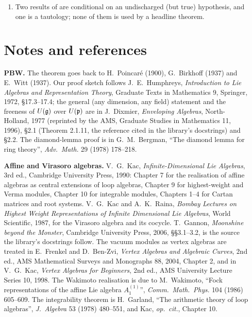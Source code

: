 \begin{enumerate}
  docstring, which still calls  an axiom and  an unproved hypothesis; the
   remark that no pbw-free proof of nonvanishing is possible; and the
  closing comment of . Comments calling  an axiom are
  out of date throughout the library (Notes/Textbook/referee/pbw\_sweep.md lists the book-side
  occurrences). None affects a Lean statement.
\item Two results of  are conditional on an undischarged (but true) hypothesis,
  and one is a tautology; none of them is used by a headline theorem.
\end{enumerate}

\section{Notes and references}\label{l02:sec:notes}

\textbf{PBW.} The theorem goes back to H.~Poincar\'e (1900), G.~Birkhoff (1937) and E.~Witt (1937). Our
proof sketch follows J.~E.~Humphreys, \emph{Introduction to Lie Algebras and Representation Theory},
Graduate Texts in Mathematics 9, Springer, 1972, \S17.3--17.4; the general (any dimension, any field)
statement and the freeness of $U(\mathfrak{g})$ over $U(\mathfrak{p})$ are in J.~Dixmier, \emph{Enveloping Algebras},
North-Holland, 1977 (reprinted by the AMS, Graduate Studies in Mathematics 11, 1996), \S2.1
(Theorem 2.1.11, the reference cited in the library's docstrings) and \S2.2. The diamond-lemma proof is in G.~M.~Bergman, ``The diamond lemma for ring theory'',
\emph{Adv.\ Math.} 29 (1978) 178--218.

\textbf{Affine and Virasoro algebras.} V.~G.~Kac, \emph{Infinite-Dimensional Lie Algebras}, 3rd ed.,
Cambridge University Press, 1990: Chapter 7 for the realisation of affine algebras as central extensions
of loop algebras, Chapter 9 for highest-weight and Verma modules, Chapter 10 for integrable
modules, Chapters 1--4 for Cartan matrices and root systems. V.~G.~Kac and A.~K.~Raina, \emph{Bombay Lectures on Highest
Weight Representations of Infinite Dimensional Lie Algebras}, World Scientific, 1987, for the Virasoro
algebra and its cocycle. T.~Gannon, \emph{Moonshine beyond the Monster}, Cambridge University Press, 2006,
\S\S3.1--3.2, is the source the library's docstrings follow. The vacuum modules as vertex algebras are
treated in E.~Frenkel and D.~Ben-Zvi, \emph{Vertex Algebras and Algebraic Curves}, 2nd ed., AMS
Mathematical Surveys and Monographs 88, 2004, Chapter 2, and in V.~G.~Kac, \emph{Vertex Algebras for
Beginners}, 2nd ed., AMS University Lecture Series 10, 1998. The Wakimoto realisation
is due to M.~Wakimoto, ``Fock representations of the affine Lie algebra $A_1^{(1)}$'', \emph{Comm.\ Math.\
Phys.} 104 (1986) 605--609. The integrability theorem is H.~Garland, ``The arithmetic theory of loop
algebras'', \emph{J.\ Algebra} 53 (1978) 480--551, and Kac, \emph{op.\ cit.}, Chapter 10.

